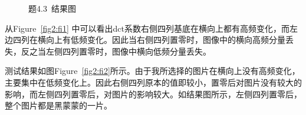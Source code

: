 \documentclass[a4paper]{article}
\begin{document}
	\begin{figure}[h]
		\centering
		\hspace{0.3cm}
		\caption{题4.3~结果图}
		\label{fig2}
	\end{figure}
	从Figure~\ref{fig2:fi1} \citep{wiki2016}中可以看出dct系数右侧四列基底在横向上都有高频变化，而左边四列在横向上有低频变化。因此当右侧四列置零时，图像中的横向高频分量丢失，反之当左侧四列置零时，图像中横向低频分量丢失。
	
	测试结果如图Figure~\ref{fig2:fi2}所示。由于我所选择的图片在横向上没有高频变化，主要集中在低频变化上。因此右侧四列原本的值即较小，置零后对图片没有较大的影响，而左侧四列置零后，对图片的影响较大。如结果图所示，左侧四列置零后，整个图片都是黑蒙蒙的一片。
	
\end{document}
